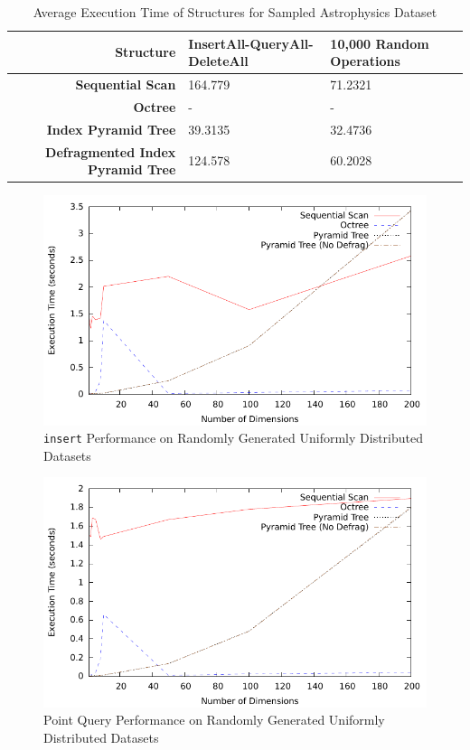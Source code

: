 \begin{landscape}
	\begin{table}
		\centering
		\begin{tabular}{|r|l|l|}
			\hline
			\textbf{Structure} & \textbf{InsertAll-QueryAll-DeleteAll} & \textbf{10,000 Random Operations} \\
			\hline
			\textbf{Sequential Scan} & 164.779 & 71.2321 \\
			\textbf{Octree} & - & - \\
			\textbf{Index Pyramid Tree} & 39.3135 & 32.4736 \\
			\textbf{Defragmented Index Pyramid Tree} & 124.578 & 60.2028 \\
			\hline
		\end{tabular}
		\caption{Average Execution Time of Structures for Sampled Astrophysics Dataset}
		\label{tab:perf1-astrophysics}
	\end{table}

\end{landscape}

\begin{figure}
	\centering
	\includegraphics[scale=0.8]{../results/end_of_iteration1/all_insert_randuniform.pdf}
	\caption{\texttt{insert} Performance on Randomly Generated Uniformly Distributed Datasets}
	\label{fig:perf-1-allinsert}
\end{figure}

\begin{figure}
	\centering
	\includegraphics[scale=0.8]{../results/end_of_iteration1/all_pquery_randuniform.pdf}
	\caption{Point Query Performance on Randomly Generated Uniformly Distributed Datasets}
	\label{fig:perf-1-allpquery}
\end{figure}

